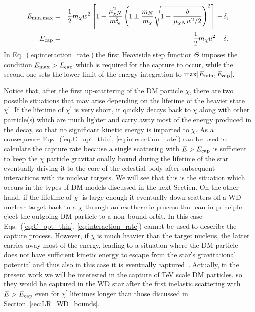 \documentclass[11pt]{article}
\begin{document}
\begin{eqnarray}
E_{\rm min, \rm max}&=& \frac{1}{2} m_{\chi} w^2 \left[1 - \frac{\mu^2_{\chi N}}{m^2_N} \left(1 \pm \frac{m_N}{m_{\chi}} 
\sqrt{1 - \frac{\delta}{\mu_{\chi N} w^2 / 2}}\right)^2 \right] - \delta ,
\nonumber\\
E_{\rm cap}&=& \frac{1}{2} m_{\chi} u^2 - \delta .
\label{eq:E_max_min_cap}
\end{eqnarray}
In Eq.~(\ref{eq:interaction_rate}) the first Heaviside step function $\Theta$ imposes the condition 
$E_{\rm max} > E_{\rm cap}$ which is required for the capture to occur, while the second one sets the lower limit of the energy integration 
to ${\rm max}[E_{\rm min}, E_{\rm cap}]$.

Notice that, after the first up-scattering of the DM particle $\chi$, 
there are two possible situations that may arise depending on the lifetime of the heavier state $\chi^{\prime}$. If the lifetime of $\chi^{\prime}$ is very short, it quickly decays back to $\chi$ along with other particle(s) which are much lighter and carry away most of the energy produced in the decay, so that no significant kinetic energy is imparted to $\chi$. As a consequence Eqs.~(\ref{eq:C_opt_thin}, \ref{eq:interaction_rate}) can be used to calculate the capture rate because a single scattering with $E>E_{\rm cap}$ is sufficient to keep the $\chi$ particle gravitationally bound during the lifetime of the star eventually driving it to the core of the celestial body after subsequent interactions with its nuclear targets. We will see that this is the situation which occurs in the types of DM models discussed in the next Section. On the other hand, if the lifetime of $\chi^{\prime}$ is large enough it eventually down-scatters off a WD nuclear target back to a $\chi$ through an exothermic process that can in principle eject the outgoing DM particle to a non--bound orbit. In this case Eqs.~(\ref{eq:C_opt_thin}, \ref{eq:interaction_rate}) cannot be used to describe the capture process. However, if $\chi$ is much heavier than the target nucleus, the latter carries away most of the energy, leading to a situation where 
the DM particle does not have sufficient kinetic energy to escape from the star's gravitational potential and thus also in this case it is eventually captured~\cite{idm_sun_Menon_2009}. Actually, in the present work we will be interested in the capture of TeV scale DM particles, so they would be captured in the WD star after the first inelastic scattering with $E>E_{\rm cap}$ even for $\chi^{\prime}$ lifetimes longer than those discussed in Section~\ref{sec:LR_WD_bounds}.
\end{document}
